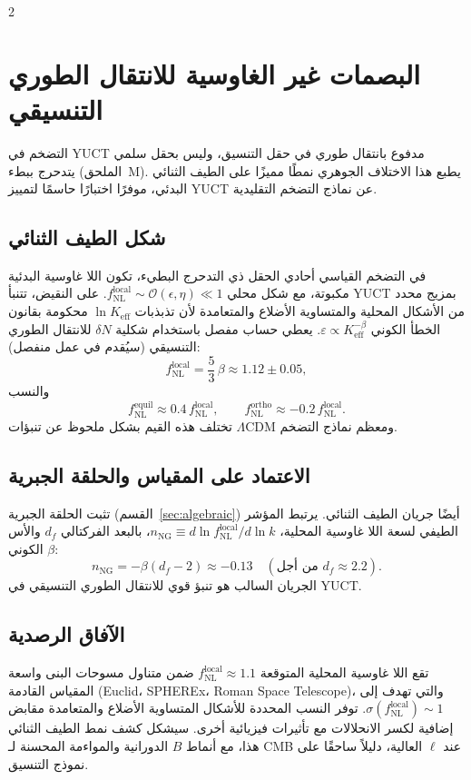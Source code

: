 \documentclass[11pt,a4paper]{article}
\begin{document}
\begin{multicols}{2}
		\section{البصمات غير الغاوسية للانتقال الطوري التنسيقي}
		\label{sec:nongaussian}
		
		التضخم في YUCT مدفوع بانتقال طوري في حقل التنسيق، وليس بحقل سلمي يتدحرج ببطء (الملحق~M). يطبع هذا الاختلاف الجوهري نمطًا مميزًا على الطيف الثنائي البدئي، موفرًا اختبارًا حاسمًا لتمييز YUCT عن نماذج التضخم التقليدية.
		
		\subsection{شكل الطيف الثنائي}
		في التضخم القياسي أحادي الحقل ذي التدحرج البطيء، تكون اللا غاوسية البدئية مكبوتة، مع شكل محلي \(f_{\mathrm{NL}}^{\mathrm{local}} \sim \mathcal{O}(\epsilon,\eta) \ll 1\). على النقيض، تتنبأ YUCT بمزيج محدد من الأشكال المحلية والمتساوية الأضلاع والمتعامدة لأن تذبذبات \(\ln K_{\mathrm{eff}}\) محكومة بقانون الخطأ الكوني \(\varepsilon \propto K_{\mathrm{eff}}^{-\beta}\). يعطي حساب مفصل باستخدام شكلية \(\delta N\) للانتقال الطوري التنسيقي (سيُقدم في عمل منفصل):
		\begin{equation}
			f_{\mathrm{NL}}^{\mathrm{local}} = \frac{5}{3}\,\beta \approx 1.12 \pm 0.05,
		\end{equation}
		والنسب
		\begin{equation}
			f_{\mathrm{NL}}^{\mathrm{equil}} \approx 0.4\, f_{\mathrm{NL}}^{\mathrm{local}}, \qquad
			f_{\mathrm{NL}}^{\mathrm{ortho}} \approx -0.2\, f_{\mathrm{NL}}^{\mathrm{local}}.
		\end{equation}
		تختلف هذه القيم بشكل ملحوظ عن تنبؤات \(\Lambda\)CDM ومعظم نماذج التضخم.
		
		\subsection{الاعتماد على المقياس والحلقة الجبرية}
		تثبت الحلقة الجبرية (القسم~\ref{sec:algebraic}) أيضًا جريان الطيف الثنائي. يرتبط المؤشر الطيفي لسعة اللا غاوسية المحلية، \(n_{\mathrm{NG}} \equiv d\ln f_{\mathrm{NL}}^{\mathrm{local}} / d\ln k\)، بالبعد الفركتالي \(d_f\) والأس الكوني \(\beta\):
		\begin{equation}
			n_{\mathrm{NG}} = -\beta (d_f - 2) \approx -0.13 \quad (\text{من أجل } d_f \approx 2.2).
		\end{equation}
		الجريان السالب هو تنبؤ قوي للانتقال الطوري التنسيقي في YUCT.
		
		\subsection{الآفاق الرصدية}
		تقع اللا غاوسية المحلية المتوقعة \(f_{\mathrm{NL}}^{\mathrm{local}} \approx 1.1\) ضمن متناول مسوحات البنى واسعة المقياس القادمة (Euclid، SPHEREx، Roman Space Telescope)، والتي تهدف إلى \(\sigma(f_{\mathrm{NL}}^{\mathrm{local}}) \sim 1\). توفر النسب المحددة للأشكال المتساوية الأضلاع والمتعامدة مقابض إضافية لكسر الانحلالات مع تأثيرات فيزيائية أخرى. سيشكل كشف نمط الطيف الثنائي هذا، مع أنماط \(B\) الدورانية والمواءمة المحسنة لـ CMB عند \(\ell\) العالية، دليلاً ساحقًا على نموذج التنسيق.
		

\end{multicols}
\end{document}
